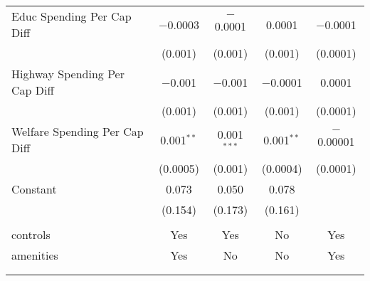 \begin{table}[!htbp]
\begin{tabular}{@{\extracolsep{5pt}}lcccc}
  Educ Spending Per Cap Diff & $-$0.0003 & $-$0.0001 & 0.0001 & $-$0.0001 \\ 
  & (0.001) & (0.001) & (0.001) & (0.0001) \\ 
  Highway Spending Per Cap Diff & $-$0.001 & $-$0.001 & $-$0.0001 & 0.0001 \\ 
  & (0.001) & (0.001) & (0.001) & (0.0001) \\ 
  Welfare Spending Per Cap Diff & 0.001$^{**}$ & 0.001$^{***}$ & 0.001$^{**}$ & $-$0.00001 \\ 
  & (0.0005) & (0.001) & (0.0004) & (0.0001) \\ 
  Constant & 0.073 & 0.050 & 0.078 &  \\ 
  & (0.154) & (0.173) & (0.161) &  \\ 
 \hline \\[-1.8ex] 
controls & Yes & Yes & No & Yes \\ 
amenities & Yes & No & No & Yes \\ 
\hline \\[-1.8ex] 
\hline 
\hline \\[-1.8ex] 
\end{tabular} 
\end{table} 
